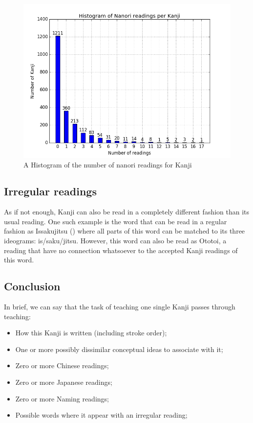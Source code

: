 \begin{figure}[ht]
    \centering
    \includegraphics[width=\textwidth]{Cap1/HistogramNanori}
    \caption{A Histogram of the number of nanori readings for Kanji}
    \label{fig:nanorihist}
\end{figure}

\clearpage

\subsection{Irregular readings}

As if not enough, Kanji can also be read in a completely different fashion than its usual reading. One such example is the word  that can be read in a regular fashion as Issakujitsu () where all parts of this word can be matched to its three ideograms: is/saku/jitsu. However, this word can also be read as Ototoi, a reading that have no connection whatsoever to the accepted Kanji readings of this word.

\subsection{Conclusion}

In brief, we can say that the task of teaching one single Kanji passes through teaching:
\begin{itemize}
    \item How this Kanji is written (including stroke order);
    \item One or more possibly dissimilar conceptual ideas to associate with it;
    \item Zero or more Chinese readings;
    \item Zero or more Japanese readings;
    \item Zero or more Naming readings;
    \item Possible words where it appear with an irregular reading;
\end{itemize}

